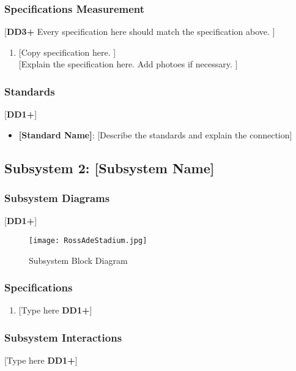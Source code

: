 \documentclass[letterpaper, 11pt]{article}
\begin{document}
\subsubsection{Specifications Measurement}
[\textbf{DD3+} Every specification here should match the specification above. ]
\begin{enumerate}
    \item {[Copy specification here. ]} \\
    {[Explain the specification here. Add photoes if necessary. ]}
\end{enumerate}

\subsubsection{Standards}
[\textbf{DD1+}]
\begin{itemize}
    \item \textbf{[Standard Name]}: [Describe the standards and explain the connection]
\end{itemize}

\clearpage
\subsection{Subsystem 2: [Subsystem Name]}

\subsubsection{Subsystem Diagrams}
[\textbf{DD1+}]
\begin{figure}[h]
    \centering
    \texttt{[image: RossAdeStadium.jpg]} %
    \caption{Subsystem Block Diagram}
\end{figure} %

\subsubsection{Specifications}
\begin{enumerate}
    \item {[Type here \textbf{DD1+}]}
\end{enumerate}

\subsubsection{Subsystem Interactions}
[Type here \textbf{DD1+}]
\end{document}
